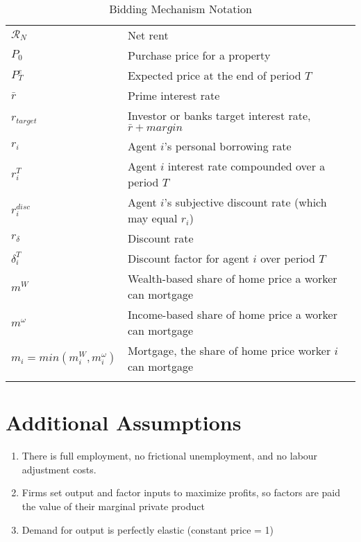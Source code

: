 \begin{longtable}{lp{10cm}}
\caption{Bidding Mechanism Notation}                                          \\
\hline
$\mathcal{R}_N$  &  Net rent                                                  \\ %
$P_0$            &  Purchase price for a property                             \\
$P^e_T$          &  Expected price at the end of period $T$                   \\
$\bar r$         &  Prime interest rate                                       \\
$r_{target}$     &  Investor or banks target interest rate, $\bar r + margin$ \\
$r_i$            &  Agent $i$'s personal borrowing rate                       \\
$r_i^T$          &  Agent $i$ interest rate compounded over a period $T$      \\
$r_i^{disc}$     &  Agent $i$'s subjective discount rate (which may equal $r_i$) \\
$r_\delta$       &  Discount rate                                             \\ %
$\delta_i^T$     &  Discount factor for agent $i$ over period $T$             \\
$m^W$            &  Wealth-based share of home price a worker can mortgage    \\ %
$m^\omega$       &  Income-based share of home price a worker can mortgage    \\ %
$m_i = min(m^W_i, m^\omega_i)$  & Mortgage, the share of home price worker $i$ can mortgage \\

\hline
\color{black}
\end{longtable}  




\section{Additional Assumptions}
\begin{enumerate}
\item There is full employment, no frictional unemployment, and no labour adjustment costs.
\item Firms set output and factor inputs to maximize profits, so factors are paid the value of their marginal private product
\item Demand for output is perfectly elastic (constant price = 1)
\end{enumerate}
